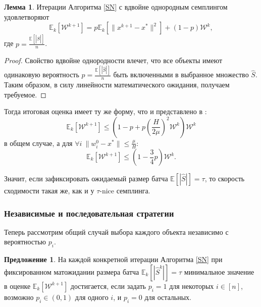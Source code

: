 \documentclass{article}
\theoremstyle{definition}
\theoremstyle{assumption}
\theoremstyle{lemma}
\newtheorem{lemma}{Лемма}
\theoremstyle{theorem}
\theoremstyle{proposition}
\newtheorem{proposition}{Предложение}
\begin{document}
	\begin{lemma} \label{lemma:4}
		Итерации Алгоритма \ref{SN} с вдвойне однородным семплингом удовлетворяют
		\begin{equation}
			\mathbb E_k[\mathcal W^{k+1}] = p \mathbb E_k[\| x^{k+1} - x^* \|^2] + \left(1 - p \right) \mathcal W^k,
		\end{equation}
		где $p = \frac{\mathbb E[|\hat S|]}{n}$.
	\end{lemma}
	\begin{proof}
		Свойство вдвойне однородности влечет, что все объекты имеют одинаковую вероятность $p = \frac{\mathbb E[|\hat S|]}{n}$ быть включенными в выбранное множество $\hat S$. Таким образом, в силу линейности математического ожидания, получаем требуемое.
	\end{proof}
	Тогда итоговая оценка имеет ту же форму, что и представлено в \cite{kovalev2019stochastic}:
	\begin{equation}\label{DU convergence}
		\mathbb E_k[\mathcal W^{k+1}] \leqslant \left( 1 - p + p \left( \frac{H}{2\mu} \right)^2 \mathcal W^k \right) \mathcal W^k
	\end{equation}
	в общем случае, а для $\forall i\ \| w_i^0 - x^* \| \leqslant \frac{\mu}{H}$:
	\begin{equation}
		\mathbb E_k[\mathcal W^{k+1}] \leqslant \left( 1 - \frac{3}{4}p \right) \mathcal W^k.
	\end{equation}
	
	Значит, если зафиксировать ожидаемый размер батча $\mathbb E [|\hat S|] = \tau$, то скорость сходимости такая же, как и у $\tau$-nice семплинга.
	
	\subsubsection{Независимые и последовательная стратегии}
	
	Теперь рассмотрим общий случай выбора каждого объекта независимо с вероятностью $p_i$.
	
	\begin{proposition} \label{proposition:1}
		На каждой конкретной итерации Алгоритма \ref{SN} при фиксированном матожидании размера батча $\mathbb E_k[|\hat S^k|] = \tau$ минимальное значение в оценке $\mathbb E_k[\mathcal W^{k+1}]$ достигается, если задать $p_i = 1$ для некоторых $i \in [n]$, возможно $p_i \in (0, 1)$ для одного $i$, и $p_i = 0$ для остальных.
	\end{proposition}
	
\end{document}
